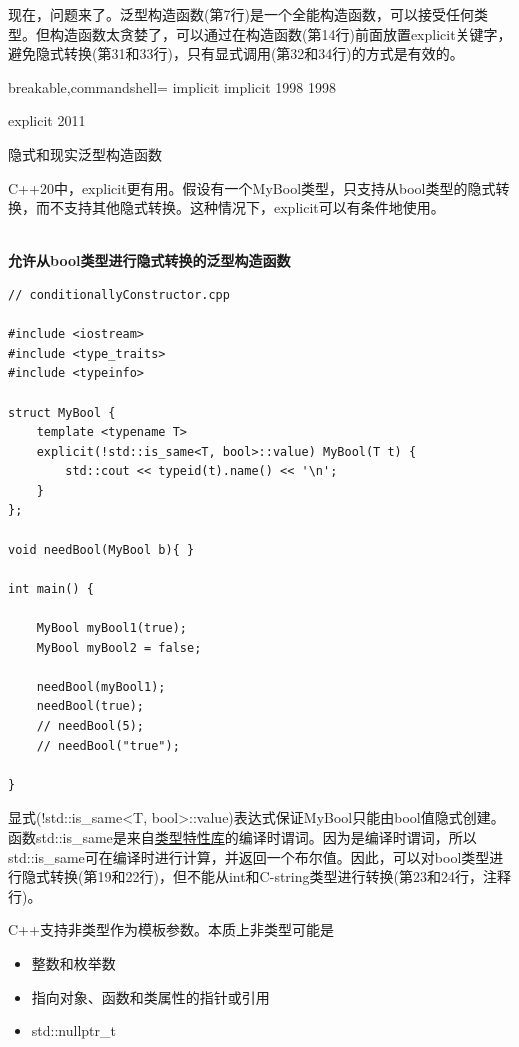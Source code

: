 现在，问题来了。泛型构造函数(第7行)是一个全能构造函数，可以接受任何类型。但构造函数太贪婪了，可以通过在构造函数(第14行)前面放置explicit关键字，避免隐式转换(第31和33行)，只有显式调用(第32和34行)的方式是有效的。

\begin{tcblisting}{breakable,commandshell={}}
implicit
implicit
1998
1998

explicit
2011
\end{tcblisting}

\begin{center}
隐式和现实泛型构造函数
\end{center}

C++20中，explicit更有用。假设有一个MyBool类型，只支持从bool类型的隐式转换，而不支持其他隐式转换。这种情况下，explicit可以有条件地使用。

\hspace*{\fill} \\ %
\noindent
\textbf{允许从bool类型进行隐式转换的泛型构造函数}
\begin{lstlisting}[style=styleCXX]
// conditionallyConstructor.cpp

#include <iostream>
#include <type_traits>
#include <typeinfo>

struct MyBool {
	template <typename T>
	explicit(!std::is_same<T, bool>::value) MyBool(T t) {
		std::cout << typeid(t).name() << '\n';
	}
};

void needBool(MyBool b){ }

int main() {

	MyBool myBool1(true);
	MyBool myBool2 = false;
	
	needBool(myBool1);
	needBool(true);
	// needBool(5);
	// needBool("true");

}
\end{lstlisting}

显式(!std::is\_same<T, bool>::value)表达式保证MyBool只能由bool值隐式创建。函数std::is\_same是来自\href{https://en.cppreference.com/w/cpp/header/type_traits}{类型特性库}的编译时谓词。因为是编译时谓词，所以std::is\_same可在编译时进行计算，并返回一个布尔值。因此，可以对bool类型进行隐式转换(第19和22行)，但不能从int和C-string类型进行转换(第23和24行，注释行)。


C++支持非类型作为模板参数。本质上非类型可能是

\begin{itemize}
\item 
整数和枚举数

\item 
指向对象、函数和类属性的指针或引用

\item 
std::nullptr\_t
\end{itemize}

